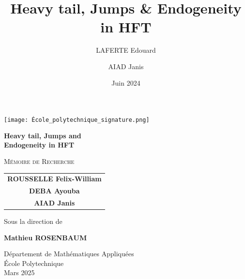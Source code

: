 \documentclass[10pt,a4paper]{article}
\title{\huge\textbf{Heavy tail, Jumps & Endogeneity in HFT}}
\author{LAFERTE Edouard \and AIAD Janis}
\date{Juin 2024}
\theoremstyle{definition}
\theoremstyle{remark}
\begin{document}
    \begin{titlepage}
        \begin{center}
            \vspace*{2cm}
            
            \texttt{[image: École\_polytechnique\_signature.png]}
            

            
            {\huge\bfseries Heavy tail, Jumps and \\[0.4cm] 
            Endogeneity in HFT \par}
            
            \vspace{2cm}
            
            {\Large\textsc{Mémoire de Recherche}\par}
            \vspace{1cm}
            
            {\large
            \begin{tabular}{c}
                \textbf{ROUSSELLE Felix-William}\\[0.2cm]
                \textbf{DEBA Ayouba}\\[0.2cm]
                \textbf{AIAD Janis}
            \end{tabular}\par}
            
            \vspace{1.5cm}
            
            {\large Sous la direction de\par}
            \vspace{0.4cm}
            {\large\textbf{Mathieu ROSENBAUM}\par}
            
            \vfill
            
            {\large Département de Mathématiques Appliquées\\
            École Polytechnique\\[0.4cm]
            Mars 2025\par}
        \end{center}
    \end{titlepage}

    \newpage
    \null
    \thispagestyle{empty}
    \newpage
\end{document}
